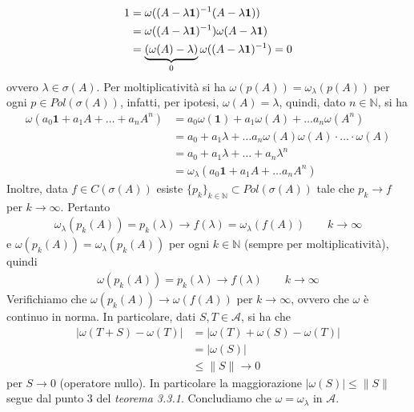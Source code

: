 \documentclass{article}
\numberwithin{equation}{subsection}
\begin{document}
\begin{align*}
    1 &= \omega((A - \lambda\mathbf{1})^{-1}(A - \lambda\mathbf{1})) \notag \\
    &= \omega((A - \lambda\mathbf{1})^{-1})\omega(A - \lambda\mathbf{1}) \notag \\
    &= \underbrace{(\omega(A) - \lambda)}_{0}\omega((A - \lambda\mathbf{1})^{-1}) = 0
\end{align*}
ovvero $\lambda \in \sigma(A)$. Per moltiplicatività si ha $\omega(p(A)) = \omega_\lambda(p(A))$ per ogni $p \in Pol(\sigma(A))$, infatti, per ipotesi, $\omega(A) = \lambda$, quindi, dato $n \in \mathbb{N}$, si ha
\begin{align*}
    \omega(a_0\mathbf{1} + a_1A + \dots + a_nA^n) &= a_0\omega(\mathbf{1}) + a_1\omega(A) + \dots a_n\omega(A^n) \\
    &= a_0 + a_1\lambda + \dots a_n\omega(A)\omega(A) \cdot \dots \cdot \omega(A) \\
    &= a_0 + a_1\lambda + \dots + a_n\lambda^n \\
    &= \omega_\lambda(a_0\mathbf{1} + a_1A + \dots a_nA^n)
\end{align*}
Inoltre, data $f \in C(\sigma(A))$ esiste $\{p_k\}_{k \in \mathbb{N}} \subset Pol(\sigma(A))$ tale che $p_k \rightarrow f$ per $k \rightarrow \infty$. Pertanto
\begin{align*}
    \omega_\lambda(p_k(A)) = p_k(\lambda) \rightarrow f(\lambda) = \omega_\lambda(f(A)) \qquad k \rightarrow \infty
\end{align*}
e $\omega(p_k(A)) = \omega_\lambda(p_k(A))$ per ogni $k \in \mathbb{N}$ (sempre per moltiplicatività), quindi
\begin{align*}
    \omega(p_k(A)) = p_k(\lambda) \rightarrow f(\lambda) \qquad k \rightarrow \infty
\end{align*}
Verifichiamo che $\omega(p_k(A)) \rightarrow \omega(f(A))$ per $k \rightarrow \infty$, ovvero che $\omega$ è continuo in norma. In particolare, dati $S, T \in \mathscr{A}$, si ha che
\begin{align*}
    |\omega(T + S) - \omega(T)| &= |\omega(T) + \omega(S) - \omega(T)| \\
    &= |\omega(S)| \\
    &\leq \|S\| \rightarrow 0
\end{align*}
per $S \rightarrow 0$ (operatore nullo). In particolare la maggiorazione $|\omega(S)| \leq \|S\|$ segue dal punto $3$ del \textit{teorema 3.3.1}. Concludiamo che $\omega = \omega_\lambda$ in $\mathscr{A}$. \\
\end{document}

